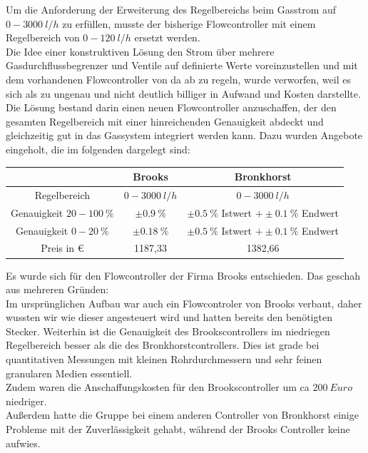 Um die Anforderung der Erweiterung des Regelbereichs beim Gasstrom auf $\SI{0} - \SI{3000}{l/h}$ zu erfüllen, musste der bisherige Flowcontroller mit einem Regelbereich von $\SI{0} - \SI{120}{l/h}$ ersetzt werden. \\
Die Idee einer konstruktiven Lösung den Strom über mehrere Gasdurchflussbegrenzer und Ventile auf definierte Werte voreinzustellen und mit dem vorhandenen Flowcontroller von da ab zu regeln, wurde verworfen, weil es sich als zu ungenau und nicht deutlich billiger in Aufwand und Kosten darstellte. \\
Die Lösung bestand darin einen neuen Flowcontroller anzuschaffen, der den gesamten Regelbereich mit einer hinreichenden Genauigkeit abdeckt und gleichzeitig gut in das Gassystem integriert werden kann. Dazu wurden Angebote eingeholt, die im folgenden dargelegt sind:

\begin{tabular}{|c|c|c|}
	\hline  & Brooks & Bronkhorst \\ 
	\hline Regelbereich & $\SI{0} - \SI{3000}{l/h}$ & $\SI{0} - \SI{3000}{l/h}$ \\ 
	\hline Genauigkeit $20 - \SI{100}{\%}$ & $\pm \SI{0,9}{\%}$ & $\pm \SI{0,5}{\%}$ Istwert $+ \pm \SI{0,1}{\%}$ Endwert\\ 
	\hline Genauigkeit $0 - \SI{20}{\%}$ & $\pm \SI{0,18}{\%}$ & $\pm \SI{0,5}{\%}$ Istwert $+ \pm \SI{0,1}{\%}$ Endwert \\ 
	\hline Preis in \euro & 1187,33 & 1382,66 \\ 
	\hline 
\end{tabular} 

\vspace{0,5cm}

Es wurde sich für den Flowcontroller der Firma Brooks entschieden. Das geschah aus mehreren Gründen: \\
Im ursprünglichen Aufbau war auch ein Flowcontroler von Brooks verbaut, daher wussten wir wie dieser angesteuert wird und hatten bereits den benötigten Stecker. Weiterhin ist die Genauigkeit des Brookscontrollers im niedriegen Regelbereich besser als die des Bronkhorstcontrollers. Dies ist grade bei quantitativen Messungen mit kleinen Rohrdurchmessern und sehr feinen granularen Medien essentiell. \\
Zudem waren die Anschaffungskosten für den Brookscontroller um ca $\SI{200}{Euro}$ niedriger.\\
Außerdem hatte die Gruppe bei einem anderen Controller von Bronkhorst einige Probleme mit der Zuverlässigkeit gehabt, während der Brooks Controller keine aufwies.


